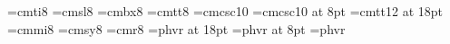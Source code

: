 \documentclass[manuscript]{acmart}
\begin{document}
\def\thickrule{\hrule\hrule\hrule}
\def\codent{\hskip 1.0em} %

\font\itVIII=cmti8 \font\slVIII=cmsl8 \font\bfVIII=cmbx8
\font\ttVIII=cmtt8 \font\caps=cmcsc10 \font\capsVIII=cmcsc10 at 8pt
\font\ttXVIII=cmtt12 at 18pt \font\eightmi=cmmi8 \font\eightsy=cmsy8
\font\rmeight=cmr8  \def\rmVIII{\rmeight \baselineskip=10pt plus 2pt
minus 1pt \lineskiplimit=2pt \lineskip=2pt plus 1pt
\parskip=0pt \textfont0=\rmeight \textfont1=\eightmi \textfont2=\eightsy}
\font\hlvXVIII=phvr at 18pt \font\hlvVIII=phvr at 8pt \font\hlv=phvr
\def\:{\mathrel{:\mathord=}}
















\end{document}
